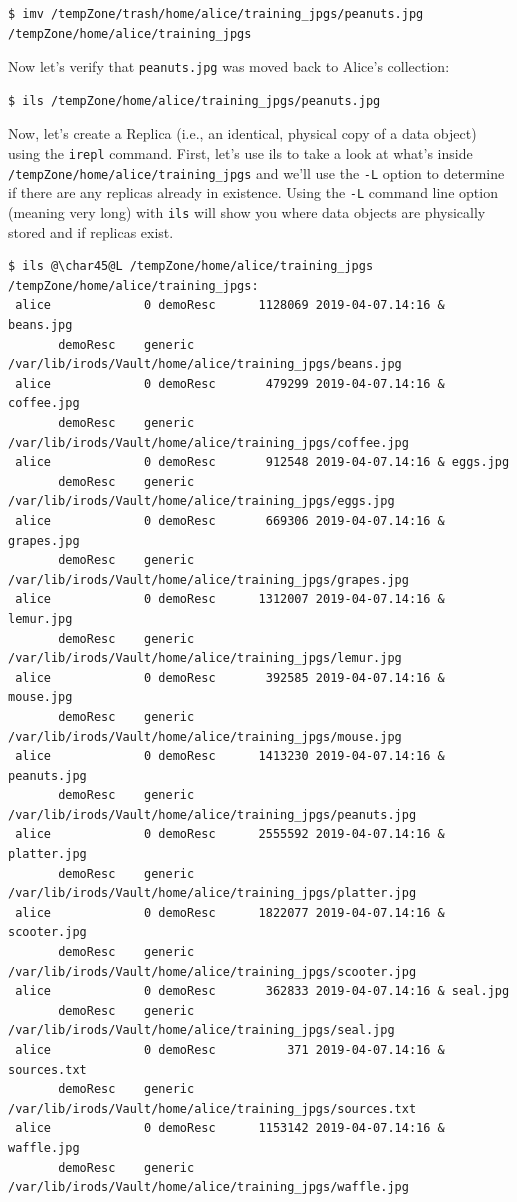 \documentclass[10pt,oneside]{memoir}
\begin{document}
\begin{lstlisting}[basicstyle=\tiny\ttfamily]
$ imv /tempZone/trash/home/alice/training_jpgs/peanuts.jpg /tempZone/home/alice/training_jpgs
\end{lstlisting}

Now let's verify that \texttt{peanuts.jpg} was moved back to Alice's collection:

\begin{lstlisting}
$ ils /tempZone/home/alice/training_jpgs/peanuts.jpg
\end{lstlisting}

\newpage

Now, let's create a Replica (i.e., an identical, physical copy of a data object) using the \texttt{irepl} command. First, let's use ils to take a look at what's inside \texttt{/tempZone/home/alice/training\_jpgs} and we'll use the \texttt{-L} option to determine if there are any replicas already in existence. Using the \texttt{-L} command line option (meaning very long) with \texttt{ils} will show you where data objects are physically stored and if replicas exist.

\begin{lstlisting}[basicstyle=\tiny]
$ ils @\char45@L /tempZone/home/alice/training_jpgs
/tempZone/home/alice/training_jpgs:
 alice             0 demoResc      1128069 2019-04-07.14:16 & beans.jpg
       demoResc    generic    /var/lib/irods/Vault/home/alice/training_jpgs/beans.jpg
 alice             0 demoResc       479299 2019-04-07.14:16 & coffee.jpg
       demoResc    generic    /var/lib/irods/Vault/home/alice/training_jpgs/coffee.jpg
 alice             0 demoResc       912548 2019-04-07.14:16 & eggs.jpg
       demoResc    generic    /var/lib/irods/Vault/home/alice/training_jpgs/eggs.jpg
 alice             0 demoResc       669306 2019-04-07.14:16 & grapes.jpg
       demoResc    generic    /var/lib/irods/Vault/home/alice/training_jpgs/grapes.jpg
 alice             0 demoResc      1312007 2019-04-07.14:16 & lemur.jpg
       demoResc    generic    /var/lib/irods/Vault/home/alice/training_jpgs/lemur.jpg
 alice             0 demoResc       392585 2019-04-07.14:16 & mouse.jpg
       demoResc    generic    /var/lib/irods/Vault/home/alice/training_jpgs/mouse.jpg
 alice             0 demoResc      1413230 2019-04-07.14:16 & peanuts.jpg
       demoResc    generic    /var/lib/irods/Vault/home/alice/training_jpgs/peanuts.jpg
 alice             0 demoResc      2555592 2019-04-07.14:16 & platter.jpg
       demoResc    generic    /var/lib/irods/Vault/home/alice/training_jpgs/platter.jpg
 alice             0 demoResc      1822077 2019-04-07.14:16 & scooter.jpg
       demoResc    generic    /var/lib/irods/Vault/home/alice/training_jpgs/scooter.jpg
 alice             0 demoResc       362833 2019-04-07.14:16 & seal.jpg
       demoResc    generic    /var/lib/irods/Vault/home/alice/training_jpgs/seal.jpg
 alice             0 demoResc          371 2019-04-07.14:16 & sources.txt
       demoResc    generic    /var/lib/irods/Vault/home/alice/training_jpgs/sources.txt
 alice             0 demoResc      1153142 2019-04-07.14:16 & waffle.jpg
       demoResc    generic    /var/lib/irods/Vault/home/alice/training_jpgs/waffle.jpg
\end{lstlisting}
\end{document}
